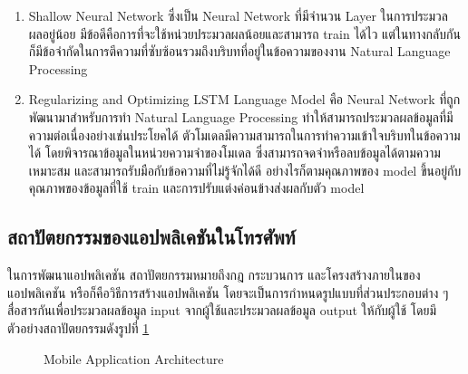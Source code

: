 \documentclass[14pt,oneside,openright,a4paper]{cpe-thai-project}
\begin{document}
    \begin{enumerate}
      \item Shallow Neural Network ซึ่งเป็น Neural Network ที่มีจำนวน Layer ในการประมวลผลอยู่น้อย มีข้อดีคือการที่จะใช้หน่วยประมวลผลน้อยและสามารถ train ได้ไว แต่ในทางกลับกันก็มีข้อจำกัดในการตีความที่ซับซ้อนรวมถึงบริบทที่อยู่ในข้อความของงาน Natural Language Processing
      \item Regularizing and Optimizing LSTM Language Model \cite{LSTM} คือ Neural Network ที่ถูกพัฒนามาสำหรับการทำ Natural Language Processing ทำให้สามารถประมวลผลข้อมูลที่มีความต่อเนื่องอย่างเช่นประโยคได้ ตัวโมเดลมีความสามารถในการทำความเข้าใจบริบทในข้อความได้ โดยพิจารณาข้อมูลในหน่วยความจำของโมเดล ซึ่งสามารถจดจำหรือลบข้อมูลได้ตามความเหมาะสม และสามารถรับมือกับข้อความที่ไม่รู้จักได้ดี อย่างไรก็ตามคุณภาพของ model ขึ้นอยู่กับคุณภาพของข้อมูลที่ใช้ train และการปรับแต่งค่อนข้างส่งผลกับตัว model
    \end{enumerate}
   
   \newpage
   \subsection { สถาปัตยกรรมของแอปพลิเคชันในโทรศัพท์ \cite{MobileAppArchitecture}} 
   ในการพัฒนาแอปพลิเคชัน สถาปัตยกรรมหมายถึงกฎ กระบวนการ และโครงสร้างภายในของแอปพลิเคชัน หรือก็คือวิธีการสร้างแอปพลิเคชัน โดยจะเป็นการกำหนดรูปแบบที่ส่วนประกอบต่าง ๆ สื่อสารกันเพื่อประมวลผลข้อมูล input จากผู้ใช้และประมวลผลข้อมูล output ให้กับผู้ใช้ โดยมีตัวอย่างสถาปัตยกรรมดังรูปที่ \ref{fig:mobile_arc1}

    \begin{figure}[!h]\centering
      \setlength{\fboxrule}{0.5mm} %
      \setlength{\fboxsep}{0.5cm}
      \caption{Mobile Application Architecture \cite{MobileAppArchitectureOverview}}\label{fig:mobile_arc1}
    \end{figure}
\end{document}
